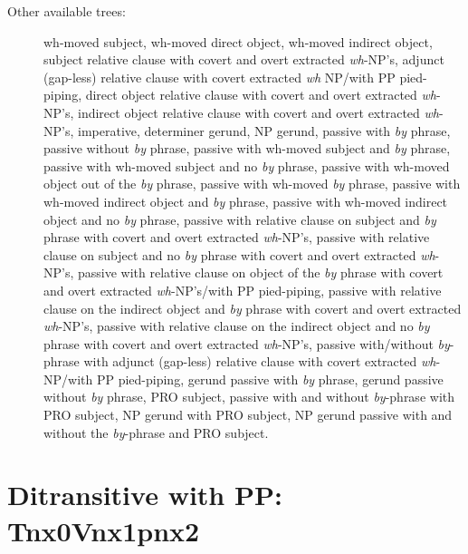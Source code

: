 \begin{description}
\item[Other available trees:] wh-moved subject, wh-moved direct object,
wh-moved indirect object, subject relative clause with covert and overt
extracted {\it wh}-NP's, adjunct (gap-less) relative clause with covert
extracted {\it wh} NP/with PP pied-piping, direct object relative clause
with covert and overt extracted {\it wh}-NP's, indirect object relative
clause with covert and overt extracted {\it wh}-NP's, imperative,
determiner gerund, NP gerund, passive with {\it by} phrase, passive without
{\it by} phrase, passive with wh-moved subject and {\it by} phrase, passive
with wh-moved subject and no {\it by} phrase, passive with wh-moved object
out of the {\it by} phrase, passive with wh-moved {\it by} phrase, passive
with wh-moved indirect object and {\it by} phrase, passive with wh-moved
indirect object and no {\it by} phrase, passive with relative clause on
subject and {\it by} phrase with covert and overt extracted {\it wh}-NP's,
passive with relative clause on subject and no {\it by} phrase with covert
and overt extracted {\it wh}-NP's, passive with relative clause on object
of the {\it by} phrase with covert and overt extracted {\it wh}-NP's/with
PP pied-piping, passive with relative clause on the indirect object and
{\it by} phrase with covert and overt extracted {\it wh}-NP's, passive with
relative clause on the indirect object and no {\it by} phrase with covert
and overt extracted {\it wh}-NP's, passive with/without {\it by}-phrase
with adjunct (gap-less) relative clause with covert extracted {\it
wh}-NP/with PP pied-piping, gerund passive with {\it by} phrase, gerund
passive without {\it by} phrase, PRO subject, passive with and without {\it
by}-phrase with PRO subject, NP gerund with PRO subject, NP gerund passive
with and without the {\it by}-phrase and PRO subject.


\end{description}


\section{Ditransitive with PP: Tnx0Vnx1pnx2}
\label{nx0Vnx1pnx2-family}

